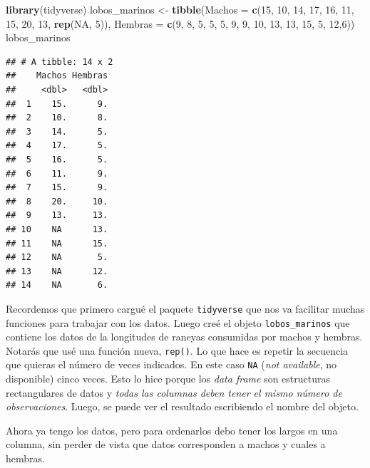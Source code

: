 \documentclass[]{book}
\newenvironment{Shaded}{\begin{snugshade}}{\end{snugshade}}
\newcommand{\DataTypeTok}[1]{\textcolor[rgb]{0.13,0.29,0.53}{#1}}
\newcommand{\DecValTok}[1]{\textcolor[rgb]{0.00,0.00,0.81}{#1}}
\newcommand{\KeywordTok}[1]{\textcolor[rgb]{0.13,0.29,0.53}{\textbf{#1}}}
\newcommand{\NormalTok}[1]{#1}
\newcommand{\OtherTok}[1]{\textcolor[rgb]{0.56,0.35,0.01}{#1}}
\newcommand{\StringTok}[1]{\textcolor[rgb]{0.31,0.60,0.02}{#1}}
\theoremstyle{definition}
\theoremstyle{definition}
\theoremstyle{definition}
\theoremstyle{remark}
\begin{document}
\begin{Shaded}
\begin{Highlighting}[]
\KeywordTok{library}\NormalTok{(tidyverse)}
\NormalTok{lobos_marinos <-}\StringTok{ }\KeywordTok{tibble}\NormalTok{(}\DataTypeTok{Machos =} \KeywordTok{c}\NormalTok{(}\DecValTok{15}\NormalTok{, }\DecValTok{10}\NormalTok{, }\DecValTok{14}\NormalTok{, }\DecValTok{17}\NormalTok{, }\DecValTok{16}\NormalTok{, }\DecValTok{11}\NormalTok{, }\DecValTok{15}\NormalTok{, }\DecValTok{20}\NormalTok{, }\DecValTok{13}\NormalTok{, }\KeywordTok{rep}\NormalTok{(}\OtherTok{NA}\NormalTok{, }\DecValTok{5}\NormalTok{)),}
           \DataTypeTok{Hembras =} \KeywordTok{c}\NormalTok{(}\DecValTok{9}\NormalTok{, }\DecValTok{8}\NormalTok{, }\DecValTok{5}\NormalTok{, }\DecValTok{5}\NormalTok{, }\DecValTok{5}\NormalTok{, }\DecValTok{9}\NormalTok{, }\DecValTok{9}\NormalTok{, }\DecValTok{10}\NormalTok{, }\DecValTok{13}\NormalTok{, }\DecValTok{13}\NormalTok{, }\DecValTok{15}\NormalTok{, }\DecValTok{5}\NormalTok{, }\DecValTok{12}\NormalTok{,}\DecValTok{6}\NormalTok{))}
\NormalTok{lobos_marinos}
\end{Highlighting}
\end{Shaded}

\begin{verbatim}
## # A tibble: 14 x 2
##    Machos Hembras
##     <dbl>   <dbl>
##  1    15.      9.
##  2    10.      8.
##  3    14.      5.
##  4    17.      5.
##  5    16.      5.
##  6    11.      9.
##  7    15.      9.
##  8    20.     10.
##  9    13.     13.
## 10    NA      13.
## 11    NA      15.
## 12    NA       5.
## 13    NA      12.
## 14    NA       6.
\end{verbatim}

Recordemos que primero cargué el paquete \texttt{tidyverse} que nos va
facilitar muchas funciones para trabajar con los datos. Luego creé el
objeto \texttt{lobos\_marinos} que contiene los datos de la longitudes
de raneyas consumidas por machos y hembras. Notarás que usé una función
nueva, \texttt{rep()}. Lo que hace es repetir la secuencia que quieras
el número de veces indicados. En este caso \texttt{NA} (\emph{not
available}, no disponible) cinco veces. Esto lo hice porque los
\emph{data frame} son estructuras rectangulares de datos y \emph{todas
las columnas deben tener el mismo número de observaciones}. Luego, se
puede ver el resultado escribiendo el nombre del objeto.

Ahora ya tengo los datos, pero para ordenarlos debo tener los largos en
una columna, sin perder de vista que datos corresponden a machos y
cuales a hembras.
\end{document}
